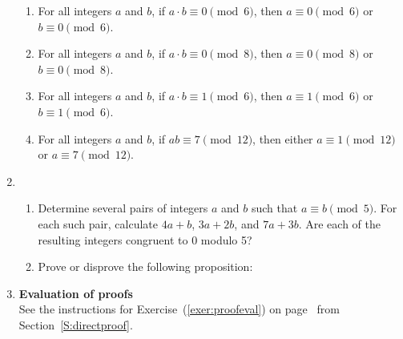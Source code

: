 \begin{enumerate}
\begin{enumerate}
\item For all integers $a$ and $b$, if  $a \cdot b \equiv 0 \pmod{6}$, then $a \equiv 0 \pmod{6}$ or $b \equiv 0 \pmod{6}$.

\item For all integers $a$ and $b$, if  $a \cdot b \equiv 0 \pmod{8}$, then $a \equiv 0 \pmod{8}$ or $b \equiv 0 \pmod{8}$.

\item For all integers $a$ and $b$, if  $a \cdot b \equiv 1 \pmod{6}$, then $a \equiv 1 \pmod{6}$ or $b \equiv 1 \pmod{6}$.

\item For all integers $a$ and $b$, if $ab \equiv 7 \pmod{12}$, then either 
$a \equiv 1 \pmod{12}$ or $a \equiv 7 \pmod{12}$.
\end{enumerate}



\item \begin{enumerate}
\item Determine several pairs of integers $a$ and $b$ such that $a \equiv b \pmod 5$.  For each such pair, calculate $4a + b$, $3a + 2b$, and $7a + 3b$.  Are each of the resulting integers congruent to 0 modulo 5?

\item Prove or disprove the following proposition:
\end{enumerate}




\item \textbf{Evaluation of proofs}  \hfill \\
See the instructions for Exercise~(\ref{exer:proofeval}) on 
page~\pageref{exer:proofeval} from Section~\ref{S:directproof}.


\end{enumerate}
